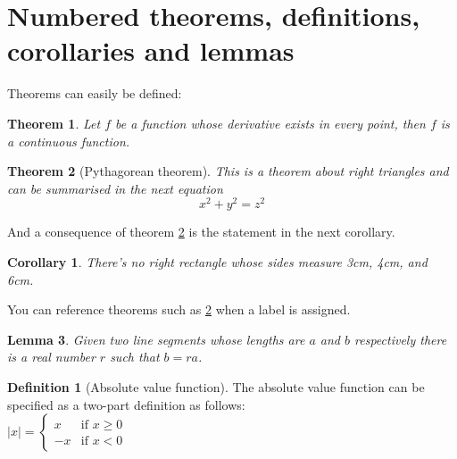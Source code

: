 \documentclass{article}
\newtheorem{theorem}{Theorem}[section]
\newtheorem{corollary}{Corollary}[theorem]
\newtheorem{lemma}[theorem]{Lemma}
\theoremstyle{definition}
\newtheorem{definition}{Definition}[section]
\begin{document}
\section{Numbered theorems, definitions, corollaries and lemmas}
Theorems can easily be defined:
\begin{theorem}
Let \(f\) be a function whose derivative exists in every point, then \(f\) is 
a continuous function.
\end{theorem}
\begin{theorem}[Pythagorean theorem]
\label{pythagorean}
This is a theorem about right triangles and can be summarised in the next 
equation 
\[ x^2 + y^2 = z^2 \]
\end{theorem}
And a consequence of theorem \ref{pythagorean} is the statement in the next 
corollary.
\begin{corollary}
There's no right rectangle whose sides measure 3cm, 4cm, and 6cm.
\end{corollary}
You can reference theorems such as \ref{pythagorean} when a label is assigned.
\begin{lemma}
Given two line segments whose lengths are \(a\) and \(b\) respectively there is a 
real number \(r\) such that \(b=ra\).
\end{lemma}
\begin{definition}[Absolute value function] 
The absolute value function can be specified as a two-part definition as follows: \\
$
|x| =
\left\{
\begin{array}{ll}
x & \mbox{if } x \geq 0 \\
-x & \mbox{if } x < 0
\end{array}
\right.
$
\end{definition}
\end{document}
